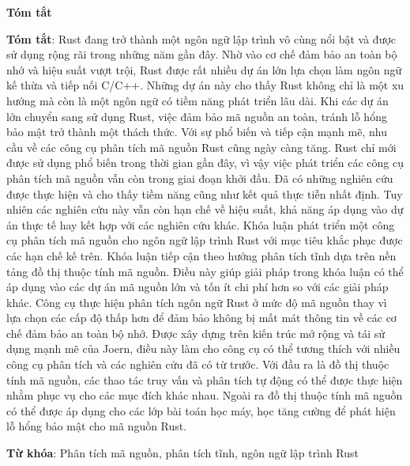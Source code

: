 \begin{center}
\textbf{\large{Tóm tắt}}
\end{center}


\begin{small}
\textbf{Tóm tắt}: Rust đang trở thành một ngôn ngữ lập trình vô cùng nổi bật và được sử dụng rộng rãi trong những năm gần đây.
Nhờ vào cơ chế đảm bảo an toàn bộ nhớ và hiệu suất vượt trội, Rust được rất nhiều dự án lớn lựa chọn làm ngôn ngữ kế thừa và tiếp nối C/C++.
Những dự án này cho thấy Rust không chỉ là một xu hướng mà còn là một ngôn ngữ có tiềm năng phát triển lâu dài.
Khi các dự án lớn chuyển sang sử dụng Rust, việc đảm bảo mã nguồn an toàn, tránh lỗ hổng bảo mật trở thành một thách thức.
Với sự phổ biến và tiếp cận mạnh mẽ, nhu cầu về các công cụ phân tích mã nguồn Rust cũng ngày càng tăng.
Rust chỉ mới được sử dụng phổ biến trong thời gian gần đây, vì vậy việc phát triển các công cụ phân tích mã nguồn vẫn còn trong giai đoạn khởi đầu.
Đã có những nghiên cứu được thực hiện và cho thấy tiềm năng cũng như kết quả thực tiễn nhất định.
Tuy nhiên các nghiên cứu này vẫn còn hạn chế về hiệu suất, khả năng áp dụng vào dự án thực tế hay kết hợp với các nghiên cứu khác.
Khóa luận phát triển một công cụ phân tích mã nguồn cho ngôn ngữ lập trình Rust với mục tiêu khắc phục được các hạn chế kế trên.
Khóa luận tiếp cận theo hướng phân tích tĩnh dựa trên nền tảng đồ thị thuộc tính mã nguồn.
Điều này giúp giải pháp trong khóa luận có thể áp dụng vào các dự án mã nguồn lớn và tốn ít chi phí hơn so với các giải pháp khác.
Công cụ thực hiện phân tích ngôn ngữ Rust ở mức độ mã nguồn thay vì lựa chọn các cấp độ thấp hơn để đảm bảo không bị mất mát thông tin về các cơ chế đảm bảo an toàn bộ nhớ.
Được xây dựng trên kiến trúc mở rộng và tái sử dụng mạnh mẽ của Joern, điều này làm cho công cụ có thể tương thích với nhiều công cụ phân tích và các nghiên cứu đã có từ trước.
Với đầu ra là đồ thị thuộc tính mã nguồn, các thao tác truy vấn và phân tích tự động có thể được thực hiện nhằm phục vụ cho các mục đích khác nhau.
Ngoài ra đồ thị thuộc tính mã nguồn có thể được áp dụng cho các lớp bài toán học máy, học tăng cường để phát hiện lỗ hổng bảo mật cho mã nguồn Rust.

\vspace*{1cm}
\textbf{Từ khóa}: Phân tích mã nguồn, phân tích tĩnh, ngôn ngữ lập trình Rust

\end{small}